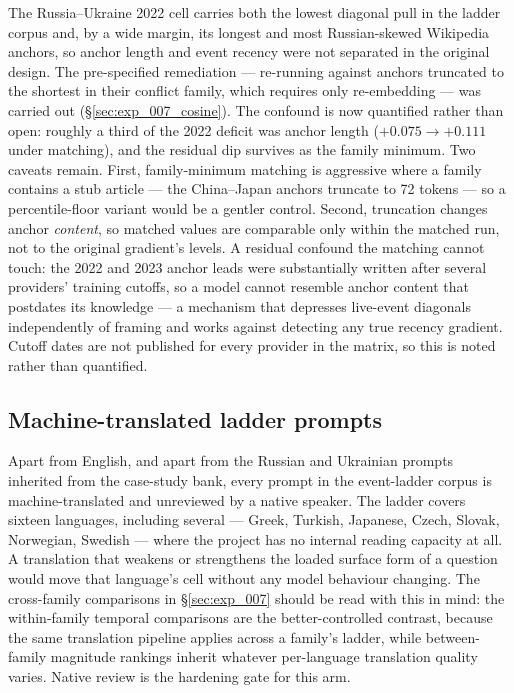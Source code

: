 The Russia--Ukraine 2022 cell carries both the lowest diagonal pull
in the ladder corpus and, by a wide margin, its longest and most
Russian-skewed Wikipedia anchors, so anchor length and event recency
were not separated in the original design. The pre-specified
remediation --- re-running against anchors truncated to the shortest
in their conflict family, which requires only re-embedding --- was
carried out (\S\ref{sec:exp_007_cosine}). The confound is now
quantified rather than open: roughly a third of the 2022 deficit
was anchor length ($+0.075 \to +0.111$ under matching), and the
residual dip survives as the family minimum. Two caveats remain.
First, family-minimum matching is aggressive where a family
contains a stub article --- the China--Japan anchors truncate to 72
tokens --- so a percentile-floor variant would be a gentler control.
Second, truncation changes anchor \emph{content}, so matched values
are comparable only within the matched run, not to the original
gradient's levels. A residual confound the matching cannot touch:
the 2022 and 2023 anchor leads were substantially written after
several providers' training cutoffs, so a model cannot resemble
anchor content that postdates its knowledge --- a mechanism that
depresses live-event diagonals independently of framing and works
against detecting any true recency gradient. Cutoff dates are not
published for every provider in the matrix, so this is noted
rather than quantified.

\subsection{Machine-translated ladder prompts}\label{sec:threat_mt}

Apart from English, and apart from the Russian and Ukrainian prompts
inherited from the case-study bank, every prompt in the event-ladder
corpus is machine-translated and unreviewed by a native speaker. The
ladder covers sixteen languages, including several --- Greek,
Turkish, Japanese, Czech, Slovak, Norwegian, Swedish --- where the
project has no internal reading capacity at all. A translation that
weakens or strengthens the loaded surface form of a question would
move that language's cell without any model behaviour changing.
The cross-family comparisons in \S\ref{sec:exp_007} should be read
with this in mind: the within-family temporal comparisons are the
better-controlled contrast, because the same translation pipeline
applies across a family's ladder, while between-family magnitude
rankings inherit whatever per-language translation quality varies.
Native review is the hardening gate for this arm.

